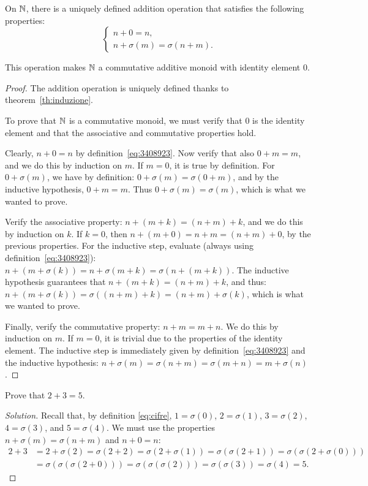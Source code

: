 \begin{theorem}[addition on $\NN$]
  \label{th:addizione_naturali}%
On $\NN$, there is a uniquely defined addition operation 
that satisfies the following properties:
\begin{equation}\label{eq:3408923}
  \begin{cases}
    n + 0 = n,\\
    n + \sigma(m) = \sigma(n+m).
  \end{cases}
\end{equation}

This operation makes $\NN$ a commutative additive monoid 
with identity element $0$.
\end{theorem}
\begin{proof}
The addition operation is uniquely defined 
thanks to theorem~\ref{th:induzione}.

To prove that $\NN$ is a commutative monoid, we must verify
that $0$ is the identity element and that the associative 
and commutative properties hold.

Clearly, $n+0=n$ by definition~\eqref{eq:3408923}. 
Now verify that also $0+m=m$, and we do this by induction on $m$.
If $m=0$, it is true by definition.
For $0+\sigma(m)$, we have by definition:
$0+\sigma(m)=\sigma(0+m)$, and by the inductive hypothesis, $0+m=m$.
Thus $0+\sigma(m)=\sigma(m)$, which is what we wanted to prove.

Verify the associative property: $n+(m+k) = (n+m)+k$, and 
we do this by induction on $k$. 
If $k=0$, then $n+(m+0)=n+m=(n+m)+0$, by the previous properties.
For the inductive step, evaluate (always using definition~\eqref{eq:3408923}):
$n+(m+\sigma(k)) = n+\sigma(m+k) =\sigma(n+(m+k))$.
The inductive hypothesis guarantees that $n+(m+k)=(n+m)+k$, and thus:
$n+(m+\sigma(k)) = \sigma((n+m)+k) = (n+m)+\sigma(k)$,
which is what we wanted to prove.

Finally, verify the commutative property: $n+m=m+n$.
We do this by induction on $m$. 
If $m=0$, it is trivial due to the properties of the identity element.
The inductive step is immediately 
given by definition~\ref{eq:3408923} 
and the inductive hypothesis: 
$n+\sigma(m) = \sigma(n+m) = \sigma(m+n) = m+\sigma(n)$.
\end{proof}

\begin{example}\label{ex235}
  Prove that $2+3=5$.
\end{example}  
%
\begin{proof}[Solution]
Recall that, by definition \eqref{eq:cifre}, 
$1=\sigma(0)$, $2=\sigma(1)$, $3=\sigma(2)$, $4=\sigma(3)$, and $5=\sigma(4)$.
We must use the properties $n+\sigma(m) = \sigma(n+m)$ 
and $n+0=n$:
\begin{align*}
2+3 &= 2 + \sigma(2) = \sigma(2+2) = \sigma(2+\sigma(1))
=\sigma(\sigma(2+1)) = \sigma(\sigma(2+\sigma(0)))\\
&=\sigma(\sigma(\sigma(2+0)))
=\sigma(\sigma(\sigma(2)))
=\sigma(\sigma(3))
=\sigma(4)=5.
\end{align*}
\end{proof}

